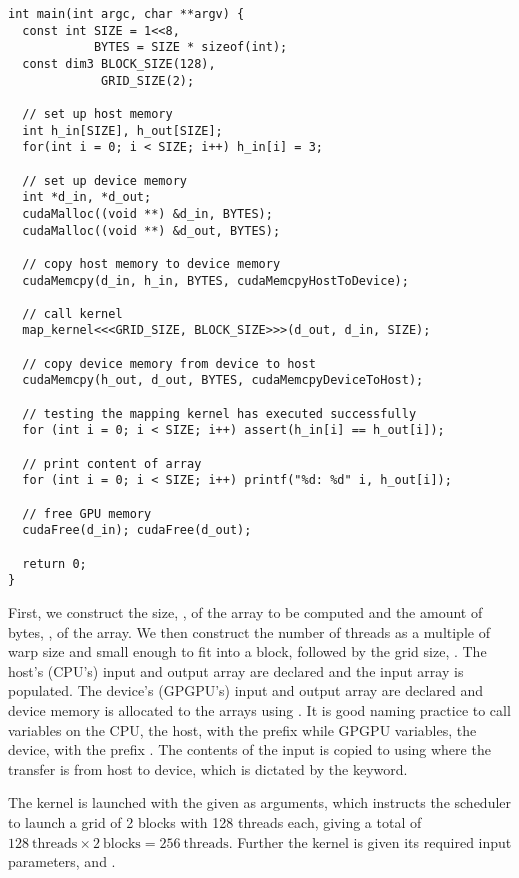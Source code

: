 \begin{lstlisting}[caption={Calling a kernel}, label={lst:kernel call example}]
int main(int argc, char **argv) {
  const int SIZE = 1<<8,
            BYTES = SIZE * sizeof(int);
  const dim3 BLOCK_SIZE(128),
             GRID_SIZE(2);

  // set up host memory
  int h_in[SIZE], h_out[SIZE];
  for(int i = 0; i < SIZE; i++) h_in[i] = 3;

  // set up device memory
  int *d_in, *d_out;
  cudaMalloc((void **) &d_in, BYTES);
  cudaMalloc((void **) &d_out, BYTES);

  // copy host memory to device memory
  cudaMemcpy(d_in, h_in, BYTES, cudaMemcpyHostToDevice);

  // call kernel
  map_kernel<<<GRID_SIZE, BLOCK_SIZE>>>(d_out, d_in, SIZE);

  // copy device memory from device to host
  cudaMemcpy(h_out, d_out, BYTES, cudaMemcpyDeviceToHost);

  // testing the mapping kernel has executed successfully
  for (int i = 0; i < SIZE; i++) assert(h_in[i] == h_out[i]);

  // print content of array
  for (int i = 0; i < SIZE; i++) printf("%d: %d" i, h_out[i]);

  // free GPU memory
  cudaFree(d_in); cudaFree(d_out);

  return 0;
}
\end{lstlisting}

First, we construct the size, , of the array to be computed and the amount of bytes, , of the array.
We then construct the number of threads as a multiple of warp size and small enough to fit into a block, followed by the grid size, .
The host's (CPU's) input  and output array  are declared and the input array  is populated.
The device's (GPGPU's) input  and output array  are declared and device memory is allocated to the arrays using .
It is good naming practice to call variables on the CPU, the host, with the prefix  while GPGPU variables, the device, with the prefix .
The contents of the input  is copied to  using  where the transfer is from host to device, which is dictated by the  keyword.

The kernel is launched with the  given as arguments, which instructs the scheduler to launch a grid of 2 blocks with 128 threads each, giving a total of $128\ \text{threads} \times 2\ \text{blocks} = 256\ \text{threads}$.
Further the kernel is given its required input parameters,  and .

